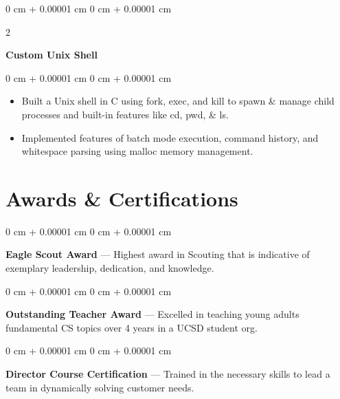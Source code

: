 \documentclass[10pt, letterpaper]{article}
\newenvironment{highlights}{
    \begin{itemize}[
        topsep=0.10 cm,
        parsep=0.10 cm,
        partopsep=0pt,
        itemsep=0pt,
        leftmargin=0 cm + 10pt
    ]
}{
    \end{itemize}
} %
\newenvironment{onecolentry}{
    \begin{adjustwidth}{
        0 cm + 0.00001 cm
    }{
        0 cm + 0.00001 cm
    }
}{
    \end{adjustwidth}
} %
\newenvironment{twocolentry}[2][]{
    \onecolentry%
    \def\secondColumn{#2}
    \setcolumnwidth{\fill, 7.0 cm}
    \begin{paracol}{2}
}{
    \switchcolumn\raggedleft\secondColumn%
    \end{paracol}
    \endonecolentry%
} %
\begin{document}
        \vspace{0.2 cm}

        \begin{twocolentry}{
            \href{https://github.com/thatchereames/custom-unix-shell}{\color{secondaryColor}{github.com/thatchereames/custom-unix-shell}}
        }
            \textbf{Custom Unix Shell}\end{twocolentry}

        \vspace{0.10 cm}
        \begin{onecolentry}
            \begin{highlights}
                \item Built a Unix shell in C using fork, exec, and kill to spawn \& manage child processes and built-in features like cd, pwd, \& ls.
                \item Implemented features of batch mode execution, command history, and whitespace parsing using malloc memory management.
            \end{highlights}
        \end{onecolentry}

    
    {\color{secondaryColor}\section{Awards \& Certifications}}

        \begin{onecolentry}
            \textbf{Eagle Scout Award} --- Highest award in Scouting that is indicative of exemplary leadership, dedication, and knowledge.
        \end{onecolentry}

        \vspace{0.1 cm}

        \begin{onecolentry}
            \textbf{Outstanding Teacher Award} --- Excelled in teaching young adults fundamental CS topics over 4 years in a UCSD student org. 
        \end{onecolentry}

        \vspace{0.1 cm}

        \begin{onecolentry}
            \textbf{Director Course Certification} --- Trained in the necessary skills to lead a team in dynamically solving customer needs.
        \end{onecolentry}
\end{document}
